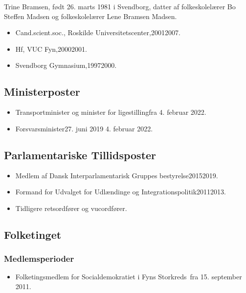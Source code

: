 \documentclass[11pt, a4paper]{awesome-cv}
\begin{document}
\makecvheader[R]
\makelettertitle
\begin{cvletter}
Trine Bramsen, født 26. marts 1981 i Svendborg, datter af folkeskolelærer Bo Steffen Madsen og folkeskolelærer Lene Bramsen Madsen.

\begin{itemize}
\item Cand.scient.soc., Roskilde Universitetscenter,20012007.
\item Hf, VUC Fyn,20002001.
\item Svendborg Gymnasium,19972000.
\end{itemize}
\subsection*{Ministerposter}
\begin{itemize}
\item Transportminister og minister for ligestillingfra 4. februar 2022.
\item Forsvarsminister27. juni 2019  4. februar 2022.
\end{itemize}
\subsection*{Parlamentariske Tillidsposter}
\begin{itemize}
\item Medlem af Dansk Interparlamentarisk Gruppes bestyrelse20152019.
\item Formand for Udvalget for Udlændinge og Integrationspolitik20112013.
\item Tidligere retsordfører og vucordfører.
\end{itemize}
\subsection*{Folketinget}
\subsubsection*{Medlemsperioder}
\begin{itemize}
\item Folketingsmedlem for Socialdemokratiet i Fyns Storkreds fra 15. september 2011.
\end{itemize}

\end{cvletter}
\end{document}
